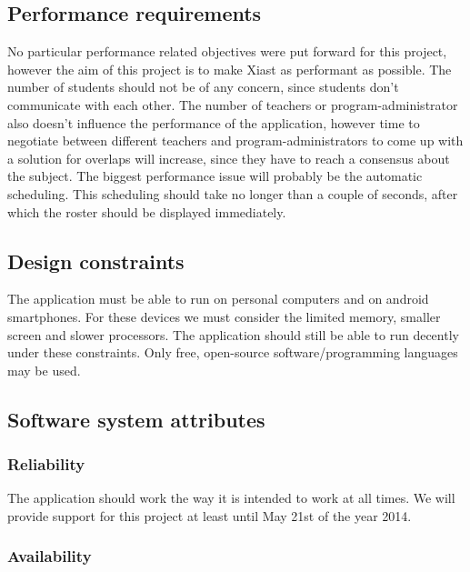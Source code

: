 \documentclass[12pt]{article}
\begin{document}
\subsection{Performance
requirements}\label{performance-requirements}

No particular performance related objectives were put forward for this
project, however the aim of this project is to make Xiast as performant
as possible. The number of students should not be of any concern, since
students don't communicate with each other. The number of teachers or
program-administrator also doesn't influence the performance of the
application, however time to negotiate between different teachers and
program-administrators to come up with a solution for overlaps will
increase, since they have to reach a consensus about the subject. The
biggest performance issue will probably be the automatic scheduling.
This scheduling should take no longer than a couple of seconds, after
which the roster should be displayed immediately.

\subsection{Design constraints}\label{design-constraints}

The application must be able to run on personal computers and on android
smartphones. For these devices we must consider the limited memory,
smaller screen and slower processors. The application should still be
able to run decently under these constraints. Only free, open-source
software/programming languages may be used.

\subsection{Software system
attributes}\label{software-system-attributes}

\subsubsection{Reliability}\label{reliability}

The application should work the way it is intended to work at all times.
We will provide support for this project at least until May 21st of the
year 2014.

\subsubsection{Availability}\label{availability}
\end{document}
